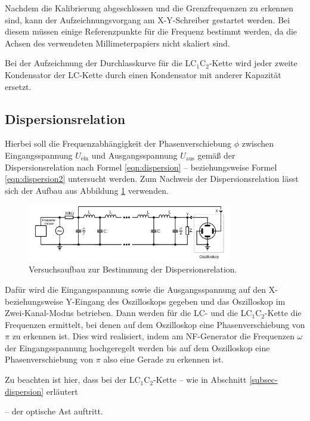Nachdem die Kalibrierung abgeschlossen und die Grenzfrequenzen zu erkennen sind, kann der Aufzeichnungsvorgang am X-Y-Schreiber gestartet werden.
Bei diesem müssen einige Referenzpunkte für die Frequenz bestimmt werden,
da die Achsen des verwendeten Millimeterpapiers nicht skaliert sind.

Bei der Aufzeichnung der Durchlasskurve für die LC$_1$C$_2$-Kette wird jeder zweite Kondensator der LC-Kette durch einen Kondensator mit anderer Kapazität ersetzt.


\subsection{Dispersionsrelation}
\label{sec:dispi}

Hierbei soll die Frequenzabhängigkeit der Phasenverschiebung $\phi$
zwischen Eingangsspannung $U_{\text{ein}}$ und Ausgangsspannung $U_{\text{aus}}$ gemäß der Dispersionsrelation nach Formel \eqref{eqn:dispersion}
-- beziehungsweise Formel \eqref{eqn:dispersion2} untersucht werden.
Zum Nachweis der Dispersionsrelation lässt sich der Aufbau aus Abbildung
\ref{fig:dispersionsrealtion} verwenden.
\begin{figure}
    \centering
    \includegraphics[width=0.8\textwidth]{Bilder/dispersionsrelation.png}
    \caption{Versuchsaufbau zur Bestimmung der Dispersionsrelation. \cite{Anleitung}}
    \label{fig:dispersionsrealtion}
\end{figure}
Dafür wird die Eingangsspannung sowie die Ausgangsspannung auf den X- beziehungsweise Y-Eingang
des Oszilloskops gegeben und das Oszilloskop im Zwei-Kanal-Modus betrieben.
Dann werden für die LC- und die LC$_1$C$_2$-Kette die Frequenzen ermittelt, bei denen auf
dem Oszilloskop eine Phasenverschiebung von $\pi$ zu erkennen ist.
Dies wird realisiert, indem am NF-Generator die Frequenzen $\omega$ der Eingangsspannung
hochgeregelt werden bis auf dem Oszilloskop eine Phasenverschiebung von $\pi$ also eine
Gerade zu erkennen ist.


Zu beachten ist hier, dass bei der LC$_1$C$_2$-Kette -- wie in Abschnitt \ref{subsec-dispersion} erläutert

-- der optische Ast auftritt.


